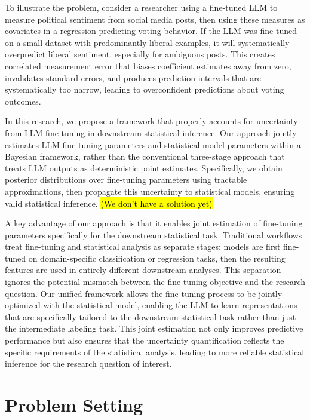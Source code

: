 \documentclass[11pt]{article}
\begin{document}
To illustrate the problem, consider a researcher using a fine-tuned LLM to measure political sentiment from social media posts, 
then using these measures as covariates in a regression predicting voting behavior. 
If the LLM was fine-tuned on a small dataset with predominantly liberal examples, 
it will systematically overpredict liberal sentiment, especially for ambiguous posts. 
This creates correlated measurement error that biases coefficient estimates away from zero, 
invalidates standard errors, and produces prediction intervals that are systematically too narrow, 
leading to overconfident predictions about voting outcomes.

In this research, we propose a framework that properly accounts for uncertainty 
from LLM fine-tuning in downstream statistical inference. 
Our approach jointly estimates LLM fine-tuning parameters and statistical model parameters 
within a Bayesian framework, rather than the conventional three-stage approach that treats LLM outputs 
as deterministic point estimates. 
Specifically, we obtain posterior distributions over fine-tuning parameters 
using tractable approximations, then propagate this uncertainty to statistical models,
ensuring valid statistical inference. \hl{(We don't have a solution yet)}

A key advantage of our approach is that it enables joint estimation of fine-tuning parameters 
specifically for the downstream statistical task. 
Traditional workflows treat fine-tuning and statistical analysis as separate stages: 
models are first fine-tuned on domain-specific classification or regression tasks, 
then the resulting features are used in entirely different downstream analyses. 
This separation ignores the potential mismatch between the fine-tuning objective 
and the research question. 
Our unified framework allows the fine-tuning process to be jointly optimized with the statistical model, 
enabling the LLM to learn representations that are specifically tailored to the downstream statistical task 
rather than just the intermediate labeling task. 
This joint estimation not only improves predictive performance but also ensures that the uncertainty quantification 
reflects the specific requirements of the statistical analysis, 
leading to more reliable statistical inference for the research question of interest.

\section{Problem Setting}
\end{document}
